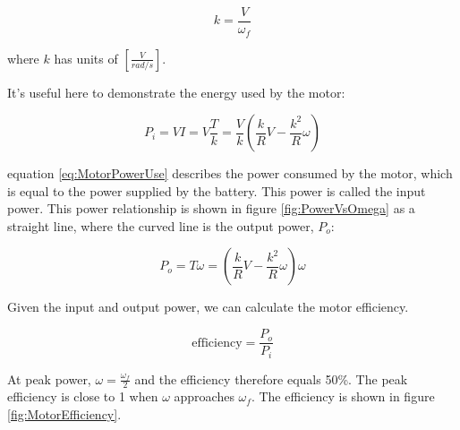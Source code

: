 \begin{equation}
k = \frac{V}{\omega_{f}}
\label{eq:MotorTorqueConstant}
\end{equation}

where $k$ has units of $[\frac{V}{rad/s}]$.

It's useful here to demonstrate the energy used by the motor:

\begin{equation}
P_{i} = VI = V\frac{T}{k} = \frac{V}{k}\left(\frac{k}{R}V - \frac{k^2}{R}\omega\right)
\label{eq:MotorPowerUse}
\end{equation}

equation \ref{eq:MotorPowerUse} describes the power consumed by the motor, which is equal to the power supplied by the battery. This power is called the input power. This power relationship is shown in figure \ref{fig:PowerVsOmega} as a straight line, where the curved line is the output power, $P_{o}$:

\begin{equation}
P_{o} = T\omega= \left(\frac{k}{R}V - \frac{k^2}{R}\omega\right)\omega
\label{eq:MotorPowerOutput}
\end{equation}

Given the input and output power, we can calculate the motor efficiency.

\begin{equation}
\mbox{efficiency} = \frac{P_{o}}{P_{i}}
\label{eq:MotorEfficiency}
\end{equation}

At peak power, $\omega = \frac{\omega_{f}}{2}$ and the efficiency therefore equals 50\%. The peak efficiency is close to 1 when $\omega$ approaches $\omega_{f}$. The efficiency is shown in figure \ref{fig:MotorEfficiency}.

